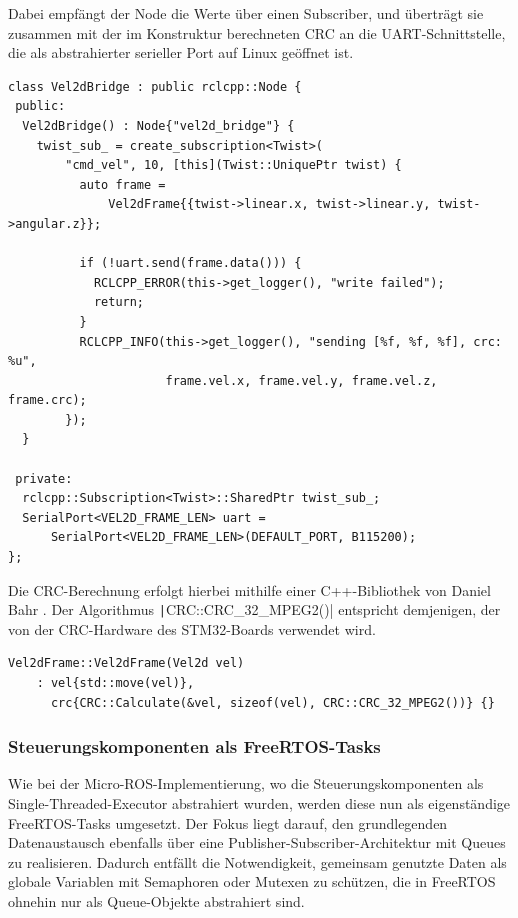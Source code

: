 Dabei empfängt der Node die Werte über einen Subscriber, und überträgt sie
zusammen mit der im Konstruktur berechneten CRC an die UART-Schnittstelle, die
als abstrahierter serieller Port auf Linux geöffnet ist.

\begin{code}
\begin{verbatim}
class Vel2dBridge : public rclcpp::Node {
 public:
  Vel2dBridge() : Node{"vel2d_bridge"} {
    twist_sub_ = create_subscription<Twist>(
        "cmd_vel", 10, [this](Twist::UniquePtr twist) {
          auto frame =
              Vel2dFrame{{twist->linear.x, twist->linear.y, twist->angular.z}};

          if (!uart.send(frame.data())) {
            RCLCPP_ERROR(this->get_logger(), "write failed");
            return;
          }
          RCLCPP_INFO(this->get_logger(), "sending [%f, %f, %f], crc: %u",
                      frame.vel.x, frame.vel.y, frame.vel.z, frame.crc);
        });
  }

 private:
  rclcpp::Subscription<Twist>::SharedPtr twist_sub_;
  SerialPort<VEL2D_FRAME_LEN> uart =
      SerialPort<VEL2D_FRAME_LEN>(DEFAULT_PORT, B115200);
};
\end{verbatim}
\end{code}

Die CRC-Berechnung erfolgt hierbei mithilfe einer C++-Bibliothek von Daniel
Bahr \cite{CRCpp}. Der Algorithmus \texttt|CRC::CRC_32_MPEG2()|
entspricht demjenigen, der von der CRC-Hardware des STM32-Boards verwendet wird.

\begin{code}
\begin{verbatim}
Vel2dFrame::Vel2dFrame(Vel2d vel)
    : vel{std::move(vel)},
      crc{CRC::Calculate(&vel, sizeof(vel), CRC::CRC_32_MPEG2())} {}
\end{verbatim}
\end{code}

\subsubsection{Steuerungskomponenten als FreeRTOS-Tasks}
\label{sec:freertos_tasks}

Wie bei der Micro-ROS-Implementierung, wo die Steuerungskomponenten als
Single-Threaded-Executor abstrahiert wurden, werden diese nun als eigenständige
FreeRTOS-Tasks umgesetzt. Der Fokus liegt darauf, den grundlegenden
Datenaustausch ebenfalls über eine Publisher-Subscriber-Architektur mit Queues
zu realisieren. Dadurch entfällt die Notwendigkeit, gemeinsam genutzte Daten als
globale Variablen mit Semaphoren oder Mutexen zu schützen, die in FreeRTOS
ohnehin nur als Queue-Objekte abstrahiert sind.

